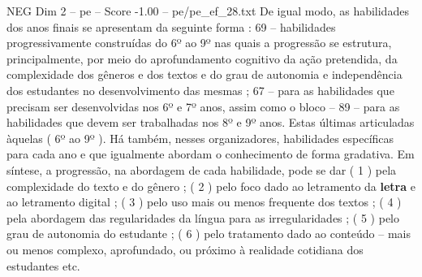 \begin{textsample}{NEG Dim 2 – pe – Score -1.00 – pe/pe\_ef\_28.txt}
De igual modo, as habilidades dos anos finais se apresentam da seguinte forma : 69 – habilidades progressivamente construídas do 6º ao 9º nas quais a progressão se estrutura, principalmente, por meio do aprofundamento cognitivo da ação pretendida, da complexidade dos gêneros e dos textos e do grau de autonomia e independência dos estudantes no desenvolvimento das mesmas ; 67 – para as habilidades que precisam ser desenvolvidas nos 6º e 7º anos, assim como o bloco – 89 – para as habilidades que devem ser trabalhadas nos 8º e 9º anos.
Estas últimas articuladas àquelas ( 6º ao 9º ).
Há também, nesses organizadores, habilidades específicas para cada ano e que igualmente abordam o conhecimento de forma gradativa.
Em síntese, a progressão, na abordagem de cada habilidade, pode se dar ( 1 ) pela complexidade do texto e do gênero ; ( 2 ) pelo foco dado ao letramento da \textbf{letra} e ao letramento digital ; ( 3 ) pelo uso mais ou menos frequente dos textos ; ( 4 ) pela abordagem das regularidades da língua para as irregularidades ; ( 5 ) pelo grau de autonomia do estudante ; ( 6 ) pelo tratamento dado ao conteúdo – mais ou menos complexo, aprofundado, ou próximo à realidade cotidiana dos estudantes etc.

\end{textsample}
